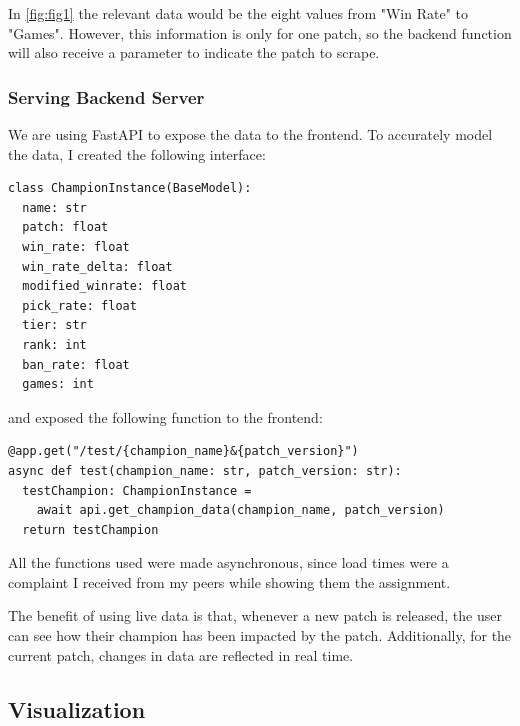 \documentclass{article}
\begin{document}
In \autoref{fig:fig1} the relevant data would be the eight values from "Win Rate"
to "Games". However, this information is only for one patch, so the backend
function will also receive a parameter to indicate the patch to scrape.

\subsubsection{Serving Backend Server} 
\label{subsubsec:Serving Backend Server}

We are using FastAPI to expose the data to the frontend. 
To accurately model the data, I created the following interface:

\begin{lstlisting}[language=Python3]
class ChampionInstance(BaseModel):
  name: str
  patch: float
  win_rate: float
  win_rate_delta: float
  modified_winrate: float
  pick_rate: float
  tier: str
  rank: int
  ban_rate: float
  games: int
\end{lstlisting}

and exposed the following function to the frontend:

\begin{lstlisting}[language=Python3]
@app.get("/test/{champion_name}&{patch_version}")
async def test(champion_name: str, patch_version: str):
  testChampion: ChampionInstance = 
    await api.get_champion_data(champion_name, patch_version)
  return testChampion
\end{lstlisting}

All the functions used were made asynchronous, since load times were a complaint 
I received from my peers while showing them the assignment. 

The benefit of using live data is that, whenever a new patch is released, the user can see how their champion has been impacted by the patch.
Additionally, for the current patch, changes in data are reflected in real time.


\subsection{Visualization}
\label{subsec:Visualization}
\end{document}
